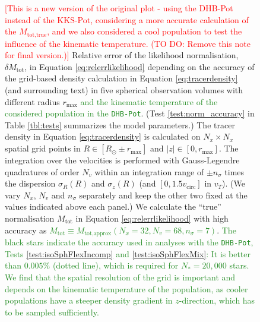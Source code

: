 \documentclass[iop,revtex4]{emulateapj}
\newcommand{\NEW}[1]{\textcolor{ForestGreen}{#1}}
\newcommand{\NOTE}[1]{\textcolor{Red}{#1}}
\newcommand{\OLD}[1]{}
\begin{document}
\begin{figure}[!htbp]
\centering
{}
\caption{\NOTE{[This is a new version of the original plot - using the DHB-Pot instead of the KKS-Pot, considering a more accurate calculation of the $M_\text{tot,true}$, and we also considered a cool population to test the influence of the kinematic temperature. (TO DO: Remove this note for final version.)]} Relative error of the likelihood normalisation, $\delta M_\text{tot}$, in Equation \eqref{eq:relerrlikelihood} depending on the accuracy of the grid-based density calculation in Equation \eqref{eq:tracerdensity} (and surrounding text) in five spherical observation volumes with different radius $r_\text{max}$ \NEW{and the kinematic temperature of the considered population in the \texttt{DHB-Pot}}. (Test \ref{test:norm_accuracy} in Table \ref{tbl:tests} summarizes the model parameters.) The tracer density in Equation \eqref{eq:tracerdensity} is calculated on $N_x\times N_x$ spatial grid points in $R \in [R_\odot \pm r_\text{max}]$ and $|z| \in [0,r_\text{max}]$. The integration over the velocities is performed with Gauss-Legendre quadratures of order $N_v$ within an integration range of $\pm n_\sigma$ times the dispersion $\sigma_R(R)$ and $\sigma_z(R)$ (and $[0,1.5v_\text{circ}]$ in $v_T$). (We vary $N_x$, $N_v$ and $n_\sigma$ separately and keep the other two fixed at the values indicated above each panel.) We calculate the ``true'' normalisation $M_\text{tot}$ in Equation \eqref{eq:relerrlikelihood} with high accuracy as \OLD{$M_\text{tot} \equiv M_\text{tot,approx}(N_x=20,N_v=56,n_\sigma=7)$}\NEW{$M_\text{tot} \equiv M_\text{tot,approx}(N_x=32,N_v=68,n_\sigma=7)$}. \OLD{The black dots indicate the accuracy used in our analyses: It is better than $0.001\%$ (dotted line).}\NEW{The black stars indicate the accuracy used in analyses with the \texttt{DHB-Pot}, Tests \ref{test:isoSphFlexIncomp} and \ref{test:isoSphFlexMix}: It is better than $0.005\%$ (dotted line), which is required for $N_*=20,000$ stars.} \OLD{We find that the accuracy depends on the \emph{spatial} resolution of the grid and requires more accurate integrations over the \emph{velocity} for larger volumes within which the density varies more strongly.}\NEW{We find that the spatial resolution of the grid is important and depends on the kinematic temperature of the population, as cooler populations have a steeper density gradient in $z$-direction, which has to be sampled sufficiently.}}
\label{fig:norm_accuracy}
\end{figure}
\end{document}
